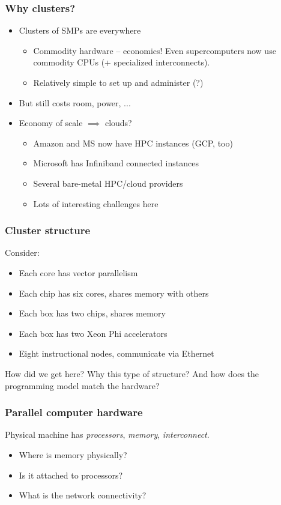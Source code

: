 \documentclass{beamer}
\begin{document}
\begin{frame}
  \titlepage
\end{frame}


\begin{frame}
  \frametitle{Why clusters?}

  \begin{itemize}
  \item Clusters of SMPs are everywhere
    \begin{itemize}
    \item Commodity hardware -- economics!  Even supercomputers
      now use commodity CPUs (+ specialized interconnects).
    \item Relatively simple to set up and administer (?)
    \end{itemize}
  \item But still costs room, power, ...
  \item Economy of scale $\implies$ clouds?
    \begin{itemize}
    \item Amazon and MS now have HPC instances (GCP, too)
    \item Microsoft has Infiniband connected instances
    \item Several bare-metal HPC/cloud providers
    \item Lots of interesting challenges here
    \end{itemize}
  \end{itemize}
\end{frame}


\begin{frame}
  \frametitle{Cluster structure}

  Consider:
  \begin{itemize}
  \item Each core has vector parallelism
  \item Each chip has six cores, shares memory with others
  \item Each box has two chips, shares memory
  \item Each box has two Xeon Phi accelerators
  \item Eight instructional nodes, communicate via Ethernet
  \end{itemize}
  How did we get here? Why this type of structure?  And how does the
  programming model match the hardware?

\end{frame}


\begin{frame}
  \frametitle{Parallel computer hardware}
  
  Physical machine has {\em processors}, {\em memory}, {\em interconnect}.
  \begin{itemize}
  \item Where is memory physically?
  \item Is it attached to processors?
  \item What is the network connectivity?
  \end{itemize}
\end{frame}
\end{document}
